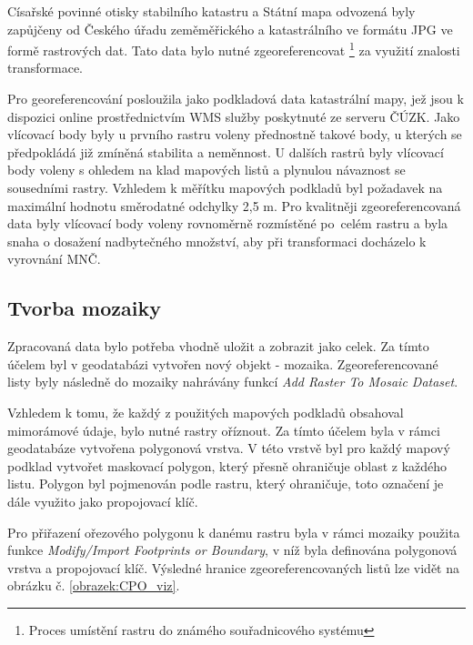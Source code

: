 \documentclass[thesis=M,czech]{FITthesis}[2012/06/26]
\begin{document}
Císařské povinné otisky stabilního katastru a Státní mapa odvozená byly zapůjčeny od Českého úřadu zeměměřického a katastrálního ve formátu JPG ve formě rastrových dat. Tato data bylo nutné zgeoreferencovat \footnote{Proces umístění rastru do známého souřadnicového systému} za využití znalosti transformace. 

Pro georeferencování posloužila jako podkladová data katastrální mapy, jež jsou k dispozici online prostřednictvím WMS služby poskytnuté ze serveru ČÚZK.  Jako vlícovací body byly u prvního rastru voleny přednostně takové body, u kterých se předpokládá již zmíněná stabilita a neměnnost. U dalších rastrů byly vlícovací body voleny s ohledem na klad mapových listů a plynulou návaznost se sousedními rastry. Vzhledem k měřítku mapových podkladů byl požadavek na maximální hodnotu směrodatné odchylky 2,5 m. Pro kvalitněji zgeoreferencovaná data byly vlícovací body voleny rovnoměrně rozmístěné po~celém rastru a byla snaha o dosažení nadbytečného množství, aby při transformaci docházelo k vyrovnání MNČ. 


\subsection{Tvorba mozaiky}
Zpracovaná data bylo potřeba vhodně uložit a zobrazit jako celek. Za tímto účelem byl v geodatabázi vytvořen nový objekt - mozaika. Zgeoreferencované listy byly následně do mozaiky nahrávány funkcí \textit{Add Raster To Mosaic Dataset}.

Vzhledem k tomu, že každý z použitých mapových podkladů obsahoval mimorámové údaje, bylo nutné rastry oříznout. Za tímto účelem byla v rámci geodatabáze vytvořena polygonová vrstva. V této vrstvě byl pro každý mapový podklad vytvořet maskovací polygon, který přesně ohraničuje oblast z každého listu. Polygon byl pojmenován podle rastru, který ohraničuje, toto označení je dále využito jako propojovací klíč. 

Pro přiřazení ořezového polygonu k danému rastru byla v rámci mozaiky použita funkce \textit{Modify/Import Footprints or Boundary}, v níž byla definována polygonová vrstva a propojovací klíč. Výsledné hranice zgeoreferencovaných listů lze vidět na obrázku č. \ref{obrazek:CPO_viz}. 
\end{document}
